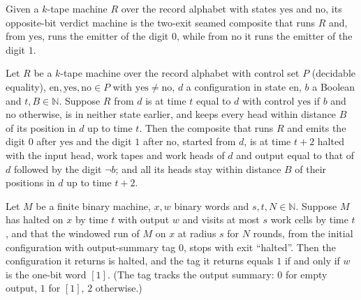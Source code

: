 \begin{definition}
\label{Complexity.sphVerdictTM}
\leanok
{}
Given a $k$-tape machine $R$ over the record alphabet with states $\mathrm{yes}$ and $\mathrm{no}$,
its opposite-bit verdict machine is the two-exit seamed composite that runs $R$ and, from $\mathrm{yes}$, runs the emitter of the digit
$0$, while from $\mathrm{no}$ it runs the emitter of the digit $1$.
\end{definition}

\begin{lemma}
\label{Complexity.sph_verdict_run}
\leanok
{}
Let $R$ be a $k$-tape machine over the record alphabet with control set $P$ (decidable equality),
$\mathrm{en},\mathrm{yes},\mathrm{no}\in P$ with $\mathrm{yes}\ne\mathrm{no}$, $d$ a configuration in
state $\mathrm{en}$, $b$ a Boolean and $t,B\in\mathbb{N}$. Suppose $R$ from $d$ is at time $t$ equal
to $d$ with control $\mathrm{yes}$ if $b$ and $\mathrm{no}$ otherwise, is in neither state earlier,
and keeps every head within distance $B$ of its position in $d$ up to time $t$. Then the composite
that runs $R$ and emits the digit $0$ after $\mathrm{yes}$ and the digit $1$ after $\mathrm{no}$,
started from $d$, is at time $t+2$ halted with the input head, work tapes and work heads of $d$ and
output equal to that of $d$ followed by the digit $\neg b$; and all its heads stay within distance
$B$ of their positions in $d$ up to time $t+2$.
\end{lemma}

\begin{lemma}
\label{Complexity.sph_summary}
\leanok
{}
Let $M$ be a finite binary machine, $x,w$ binary words and $s,t,N\in\mathbb{N}$. Suppose $M$ has
halted on $x$ by time $t$ with output $w$ and visits at most $s$ work cells by time $t$, and that
the windowed run of $M$ on $x$ at radius $s$ for $N$ rounds, from the initial configuration with
output-summary tag $0$, stops with exit ``halted''. Then the configuration it returns is halted,
and the tag it returns equals $1$ if and only if $w$ is the one-bit word $[1]$. (The tag tracks
the output summary: $0$ for empty output, $1$ for $[1]$, $2$ otherwise.)
\end{lemma}

